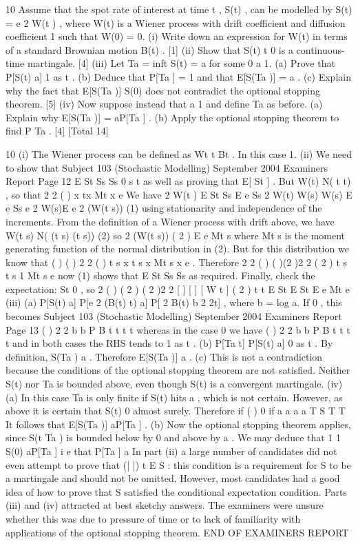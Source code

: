 
10 Assume that the spot rate of interest at time t , S(t) , can be modelled by
S(t) = e 2 W(t ) , where W(t) is a Wiener process with drift coefficient and
diffusion coefficient 1 such that W(0) = 0.
(i) Write down an expression for W(t) in terms of a standard Brownian motion
B(t) . [1]
(ii) Show that {S(t) t 0} is a continuous-time martingale. [4]
(iii) Let Ta = inf{t S(t) = a} for some 0 a 1.
(a) Prove that P[S(t) a] 1 as t .
(b) Deduce that P[Ta ] = 1 and that E[S(Ta )] = a .
(c) Explain why the fact that E[S(Ta )] S(0) does not contradict the
optional stopping theorem.
[5]
(iv) Now suppose instead that a 1 and define Ta as before.
(a) Explain why E[S(Ta )] = aP[Ta ] .
(b) Apply the optional stopping theorem to find P Ta .
[4]
[Total 14]


10 (i) The Wiener process can be defined as Wt t Bt . In this case 1.
(ii) We need to show that
Subject 103 (Stochastic Modelling) September 2004 Examiners Report
Page 12
E St Ss Ss 0 s t
as well as proving that E[ St ] .
But W(t) N( t t) , so that
2 2 ( ) x tx
Mt x e
We have
2 W(t )
E St Ss E e Ss
2 W(t) W(s) W(s)
E e Ss
e 2 W(s)E e 2 (W(t s)) (1)
using stationarity and independence of the increments.
From the definition of a Wiener process with drift above, we have
W(t s) N( (t s) (t s)) (2)
so
2 (W(t s)) ( 2 )
E e Mt s
where Mt s is the moment generating function of the normal distribution in
(2). But for this distribution we know that
( ) ( ) 2 2 ( ) t s x t s x
Mt s x e .
Therefore
2 2 ( ) ( )(2 )2 2 ( 2 ) t s t s 1
Mt s e
now (1) shows that E St Ss Ss as required.
Finally, check the expectation: St 0 , so
2 ( ) ( 2 ) ( 2 )2 2 [ ] [ ] [ W t ] ( 2 ) t t
E St E St E e Mt e
(iii) (a) P[S(t) a] P[e 2 (B(t) t) a] P[ 2 B(t) b 2 2t] , where
b = log a. If 0 , this becomes
Subject 103 (Stochastic Modelling) September 2004 Examiners Report
Page 13
( )
2 2
b b
P B t t t
t
whereas in the case 0 we have
( )
2 2
b b
P B t t t
t
and in both cases the RHS tends to 1 as t .
(b) P[Ta t] P[S(t) a] 0 as t .
By definition, S(Ta ) a . Therefore E[S(Ta )] a .
(c) This is not a contradiction because the conditions of the optional
stopping theorem are not satisfied. Neither S(t) nor Ta is bounded
above, even though S(t) is a convergent martingale.
(iv) (a) In this case Ta is only finite if S(t) hits a , which is not certain.
However, as above it is certain that S(t) 0 almost surely.
Therefore
if
( )
0 if
a
a
a
a T
S T
T
It follows that E[S(Ta )] aP[Ta ] .
(b) Now the optional stopping theorem applies, since S(t Ta ) is bounded
below by 0 and above by a .
We may deduce that
1
1 S(0) aP[Ta ] i e that P[Ta ]
a
In part (ii) a large number of candidates did not even attempt to prove that
(| |) t E S : this condition is a requirement for S to be a martingale and
should not be omitted. However, most candidates had a good idea of how to
prove that S satisfied the conditional expectation condition.
Parts (iii) and (iv) attracted at best sketchy answers. The examiners were
unsure whether this was due to pressure of time or to lack of familiarity with
applications of the optional stopping theorem.
END OF EXAMINERS REPORT
